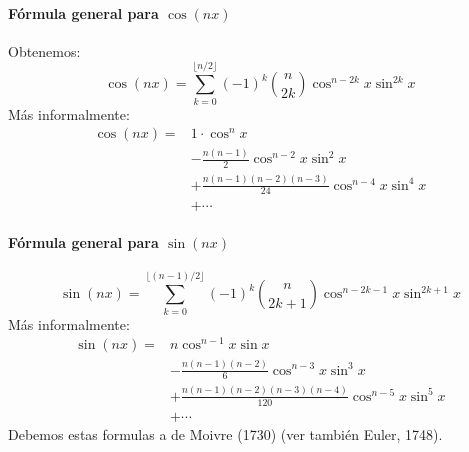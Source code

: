 \documentclass[12pt, a4paper]{article}
\theoremstyle{rioplatense}
\begin{document}
\paragraph{Fórmula general para \(\cos(nx)\)}
Obtenemos:
\[
\cos(nx) = \sum_{k=0}^{\lfloor n/2 \rfloor} (-1)^k \binom{n}{2k} \cos^{n-2k} x \sin^{2k} x
\]
Más informalmente:
\begin{align*}
\cos(nx) = {} &
1 \cdot \cos^n x \\
&- \frac{n(n-1)}{2} \cos^{n-2} x \sin^2 x \\
&+ \frac{n(n-1)(n-2)(n-3)}{24} \cos^{n-4} x \sin^4 x \\
&+ \cdots
\end{align*}
%

\paragraph{Fórmula general para \(\sin(nx)\)}
\[
\sin(nx) = \sum_{k=0}^{\lfloor (n-1)/2 \rfloor} (-1)^k \binom{n}{2k+1} \cos^{n-2k-1} x \sin^{2k+1} x
\]
Más informalmente:
\begin{align*}
\sin(nx) = {} &
n \cos^{n-1} x \sin x \\
&- \frac{n(n-1)(n-2)}{6} \cos^{n-3} x \sin^3 x \\
&+ \frac{n(n-1)(n-2)(n-3)(n-4)}{120} \cos^{n-5} x \sin^5 x \\
&+ \cdots
\end{align*}
Debemos estas formulas a de Moivre (1730) (ver también Euler, 1748).
\end{document}
